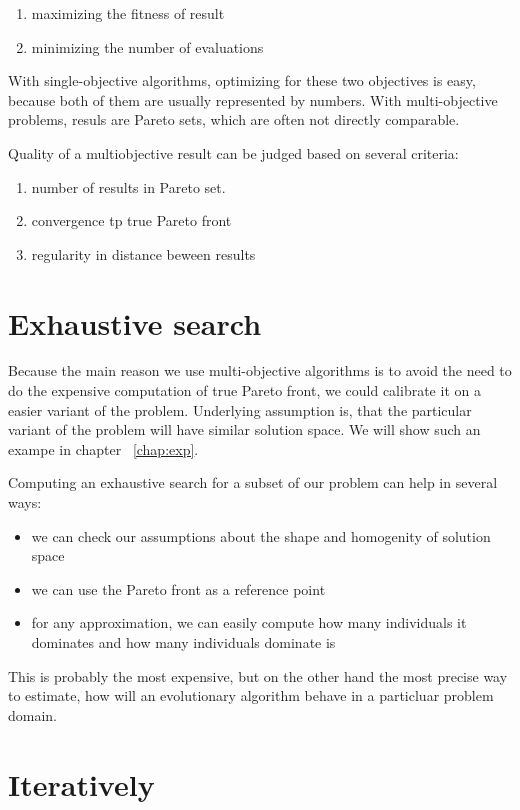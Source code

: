 \documentclass[12pt,oneside]{fithesis2}
\begin{document}
\begin{enumerate}
\item maximizing the fitness of result
\item minimizing the number of evaluations
\end{enumerate}
With single-objective algorithms, optimizing for these two objectives is easy, because both of them are usually represented by numbers.
With multi-objective problems, resuls are Pareto sets, which are often not directly comparable.

Quality of a multiobjective result can be judged based on several criteria:
\begin{enumerate}
\item number of results in Pareto set.
\item convergence tp true Pareto front
\item regularity in distance beween results
\end{enumerate}


\section{Exhaustive search}
Because the main reason we use multi-objective algorithms is to avoid the need to do the expensive computation of true Pareto front,
we could calibrate it on a easier variant of the problem. Underlying assumption is, that the particular variant of the problem will have similar solution space. We will show such an exampe in chapter ~\ref{chap:exp}.

Computing an exhaustive search for a subset of our problem can help in several ways:
\begin{itemize}
  \item we can check our assumptions about the shape and homogenity of solution space
  \item we can use the Pareto front as a reference point
  \item for any approximation, we can easily compute how many individuals it dominates and how many individuals dominate is
\end{itemize}

This is probably the most expensive, but on the other hand the most precise way to estimate, how will an evolutionary algorithm behave in a particluar problem domain.


\section{Iteratively}
\end{document}
